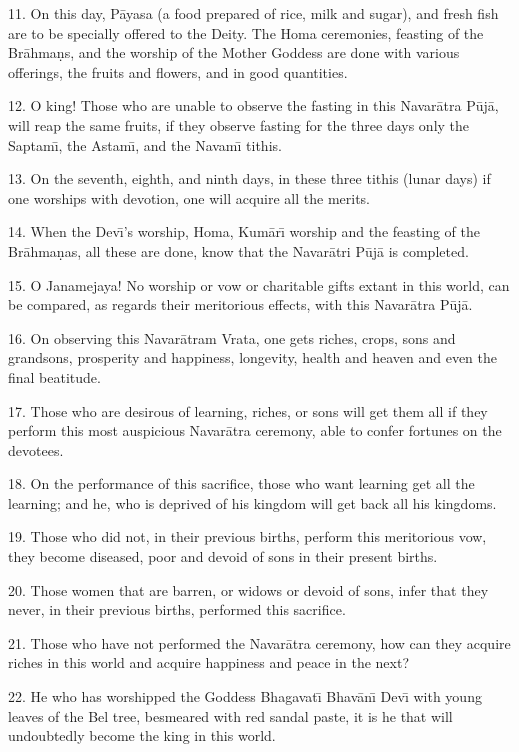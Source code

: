 11. On this day, P\=ayasa (a food prepared of rice, milk and sugar), and fresh fish are to be specially offered to the Deity. The Homa ceremonies, feasting of the Br\=ahma\d{n}s, and the worship of the Mother Goddess are done with various offerings, the fruits and flowers, and in good quantities.

12. O king! Those who are unable to observe the fasting in this Navar\=atra P\=uj\=a, will reap the same fruits, if they observe fasting for the three days only the Saptam\={\i}, the Astam\={\i}, and the Navam\={\i} tithis.

13. On the seventh, eighth, and ninth days, in these three tithis (lunar days) if one worships with devotion, one will acquire all the merits.

14. When the Dev\={\i}'s worship, Homa, Kum\=ar\={\i} worship and the feasting of the Br\=ahma\d{n}as, all these are done, know that the Navar\=atri P\=uj\=a is completed.

15. O Janamejaya! No worship or vow or charitable gifts extant in this world, can be compared, as regards their meritorious effects, with this Navar\=atra P\=uj\=a.

16. On observing this Navar\=atram Vrata, one gets riches, crops, sons and grandsons, prosperity and happiness, longevity, health and heaven and even the final beatitude.

17. Those who are desirous of learning, riches, or sons will get them all if they perform this most auspicious Navar\=atra ceremony, able to confer fortunes on the devotees.

18. On the performance of this sacrifice, those who want learning get all the learning; and he, who is deprived of his kingdom will get back all his kingdoms.

19. Those who did not, in their previous births, perform this meritorious vow, they become diseased, poor and devoid of sons in their present births.

20. Those women that are barren, or widows or devoid of sons, infer that they never, in their previous births, performed this sacrifice.

21. Those who have not performed the Navar\=atra ceremony, how can they acquire riches in this world and acquire happiness and peace in the next?

22. He who has worshipped the Goddess Bhagavat\={\i} Bhav\=an\={\i} Dev\={\i} with young leaves of the Bel tree, besmeared with red sandal paste, it is he that will undoubtedly become the king in this world.

